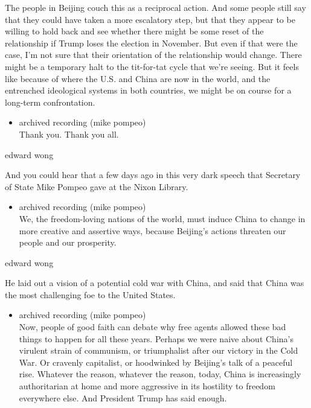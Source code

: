 The people in Beijing couch this as a reciprocal action. And some people
still say that they could have taken a more escalatory step, but that
they appear to be willing to hold back and see whether there might be
some reset of the relationship if Trump loses the election in November.
But even if that were the case, I'm not sure that their orientation of
the relationship would change. There might be a temporary halt to the
tit-for-tat cycle that we're seeing. But it feels like because of where
the U.S. and China are now in the world, and the entrenched ideological
systems in both countries, we might be on course for a long-term
confrontation.

\begin{itemize}
\tightlist
\item
  archived recording (mike pompeo)\\
  Thank you. Thank you all.
\end{itemize}

edward wong

And you could hear that a few days ago in this very dark speech that
Secretary of State Mike Pompeo gave at the Nixon Library.

\begin{itemize}
\tightlist
\item
  archived recording (mike pompeo)\\
  We, the freedom-loving nations of the world, must induce China to
  change in more creative and assertive ways, because Beijing's actions
  threaten our people and our prosperity.
\end{itemize}

edward wong

He laid out a vision of a potential cold war with China, and said that
China was the most challenging foe to the United States.

\begin{itemize}
\tightlist
\item
  archived recording (mike pompeo)\\
  Now, people of good faith can debate why free agents allowed these bad
  things to happen for all these years. Perhaps we were naive about
  China's virulent strain of communism, or triumphalist after our
  victory in the Cold War. Or cravenly capitalist, or hoodwinked by
  Beijing's talk of a peaceful rise. Whatever the reason, whatever the
  reason, today, China is increasingly authoritarian at home and more
  aggressive in its hostility to freedom everywhere else. And President
  Trump has said enough.
\end{itemize}

